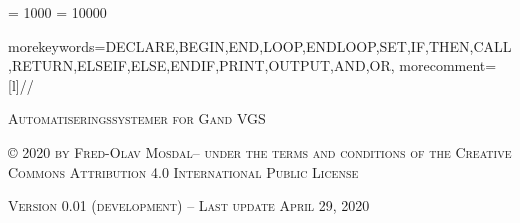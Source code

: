 \setlength{\parskip}{1em}
\setlength{\parindent}{0em}


\setlength{\textwidth}{16cm}
\setlength{\evensidemargin}{0cm}
\setlength{\oddsidemargin}{0cm}
\setlength{\extrarowheight}{3pt} %

\makeindex













\tolerance = 1000
\pretolerance = 10000



{morekeywords={DECLARE,BEGIN,END,LOOP,ENDLOOP,SET,IF,THEN,CALL,RETURN,ELSEIF,ELSE,ENDIF,PRINT,OUTPUT,AND,OR},
 morecomment=[l]{//}
}












\begin{titlepage}

\begin{center}

\textsc{\LARGE Automatiseringssystemer for Gand VGS }


\textsc{\copyright{} 2020 by Fred-Olav Mosdal-- under the terms and conditions of the Creative Commons Attribution 4.0 International Public License}

\vskip 20pt

\textsc{Version 0.01 (development) -- Last update April 29, 2020}

\end{center}

\end{titlepage}






